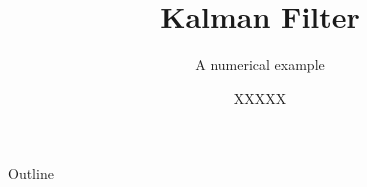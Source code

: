\documentclass{beamer}
\title{Kalman Filter}
\subtitle{A numerical example}
\author{XXXXX}
\begin{document}
\begin{frame}
  \titlepage
\end{frame}

\begin{frame}{Outline}
  \tableofcontents
\end{frame}
\end{document}
